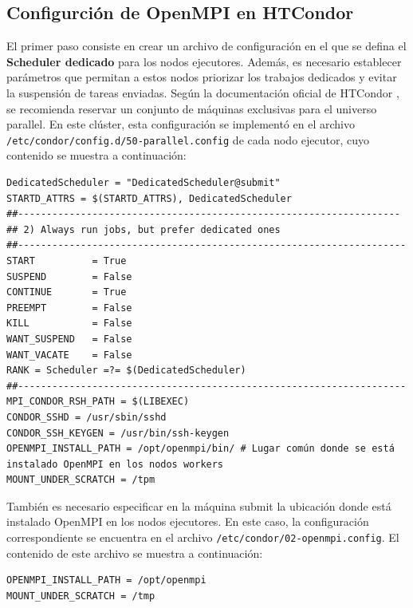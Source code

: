 \FloatBarrier\subsection{Configurción de OpenMPI en HTCondor}

El primer paso consiste en crear un archivo de configuración en el que se defina el \textbf{Scheduler dedicado} para los nodos ejecutores. Además, es necesario establecer parámetros que permitan a estos nodos priorizar los trabajos dedicados y evitar la suspensión de tareas enviadas. Según la documentación oficial de HTCondor \cite{HTCondor_Parallel}, se recomienda reservar un conjunto de máquinas exclusivas para el universo parallel. En este clúster, esta configuración se implementó en el archivo \texttt{/etc/condor/config.d/50-parallel.config} de cada nodo ejecutor, cuyo contenido se muestra a continuación:


\begin{verbatim}
DedicatedScheduler = "DedicatedScheduler@submit"
STARTD_ATTRS = $(STARTD_ATTRS), DedicatedScheduler
##-------------------------------------------------------------------
## 2) Always run jobs, but prefer dedicated ones
##--------------------------------------------------------------------
START          = True
SUSPEND        = False
CONTINUE       = True
PREEMPT        = False
KILL           = False
WANT_SUSPEND   = False
WANT_VACATE    = False
RANK = Scheduler =?= $(DedicatedScheduler) 
##--------------------------------------------------------------------
MPI_CONDOR_RSH_PATH = $(LIBEXEC)
CONDOR_SSHD = /usr/sbin/sshd
CONDOR_SSH_KEYGEN = /usr/bin/ssh-keygen
OPENMPI_INSTALL_PATH = /opt/openmpi/bin/ # Lugar común donde se está instalado OpenMPI en los nodos workers
MOUNT_UNDER_SCRATCH = /tpm
\end{verbatim}

También es necesario especificar en la máquina submit la ubicación donde está instalado OpenMPI en los nodos ejecutores. En este caso, la configuración correspondiente se encuentra en el archivo \texttt{/etc/condor/02-openmpi.config}. El contenido de este archivo se muestra a continuación:

\begin{verbatim}
OPENMPI_INSTALL_PATH = /opt/openmpi
MOUNT_UNDER_SCRATCH = /tmp
\end{verbatim}

